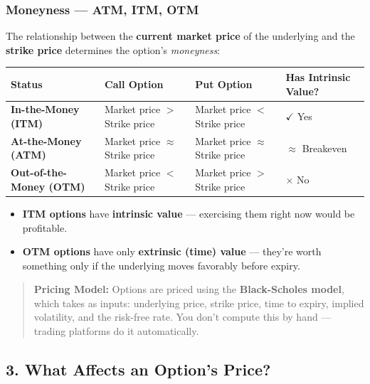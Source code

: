 \documentclass[12pt,openany]{book}
\begin{document}
\subsubsection{Moneyness — ATM, ITM, OTM}

The relationship between the \textbf{current market price} of the underlying and the \textbf{strike price} determines the option's \emph{moneyness}:

\begin{center}
\scriptsize
\setlength{\tabcolsep}{3pt}
\begin{tabular}{|L{3.0cm}|L{3.0cm}|L{3.0cm}|L{3.0cm}|}
\hline
\textbf{Status} & \textbf{Call Option} & \textbf{Put Option} & \textbf{Has Intrinsic Value?} \\
\hline
\textbf{In-the-Money (ITM)} & Market price \(>\) Strike price & Market price \(<\) Strike price & \(\checkmark\) Yes \\
\hline
\textbf{At-the-Money (ATM)} & Market price \(\approx\) Strike price & Market price \(\approx\) Strike price & \(\approx\) Breakeven \\
\hline
\textbf{Out-of-the-Money (OTM)} & Market price \(<\) Strike price & Market price \(>\) Strike price & \(\times\) No \\
\hline
\end{tabular}
\end{center}

\begin{itemize}[leftmargin=*]
    \item \textbf{ITM options} have \textbf{intrinsic value} — exercising them right now would be profitable.
    \item \textbf{OTM options} have only \textbf{extrinsic (time) value} — they're worth something only if the underlying moves favorably before expiry.
\end{itemize}

\begin{quote}
\textbf{Pricing Model:} Options are priced using the \textbf{Black-Scholes model}, which takes as inputs: underlying price, strike price, time to expiry, implied volatility, and the risk-free rate. You don't compute this by hand — trading platforms do it automatically.
\end{quote}

\subsection{3. What Affects an Option's Price?}
\end{document}
